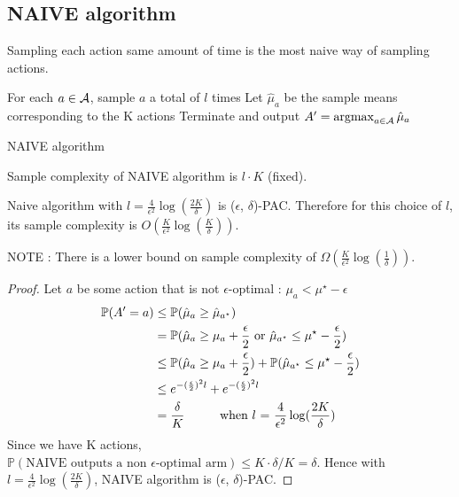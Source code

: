 \documentclass[11pt]{article}
\begin{document}
\subsection{NAIVE algorithm}
Sampling each action same amount of time is the most naive way of sampling actions. 
\begin{algorithm}
	\begin{algorithmic}[1]
		\STATE For each $a \in \mathcal{A}$, sample $a$ a total of $l$ times
		\STATE Let $\hat \mu_a$ be the sample means corresponding to the K actions
		\STATE Terminate and output $A' = \operatorname*{argmax}_{a\in\mathcal{A}}\hat\mu_a$
		\end{algorithmic}
		\caption{NAIVE algorithm}
\end{algorithm}

\noindent Sample complexity of NAIVE algorithm is $l \cdot K$ (fixed).


\begin{theorem}
	Naive algorithm with $l = \frac{4}{\epsilon^2}\log(\frac{2K}{\delta})$ is ($\epsilon$, $\delta$)-PAC. Therefore for this choice of $l$, its sample complexity is $O(\frac{K}{\epsilon^2}\log(\frac{K}{\delta}))$.
\end{theorem}		
\noindent NOTE : There is a lower bound on sample complexity of $\Omega(\frac{K}{\epsilon^2}\log(\frac{1}{\delta}))$.


\begin{proof}
Let $a$ be some action that is not $\epsilon$-optimal : $\mu_a < \mu^\star - \epsilon$
	\begin{align*}
    		\mathbb{P}(A' = a) & \leq \mathbb{P}(\hat\mu_a \geq \hat\mu_{a^\star}) \\
		& = \mathbb{P}(\hat\mu_a \geq \mu_a + \frac{\epsilon}{2} \text{ or } \hat\mu_{a^\star} \leq \mu^\star - \frac{\epsilon}{2}) \\
		& \leq \mathbb{P}(\hat\mu_a \geq \mu_a + \frac{\epsilon}{2}) + \mathbb{P}(\hat\mu_{a^\star} \leq \mu^\star - \frac{\epsilon}{2})\\
		& \leq e^{-(\frac{\epsilon}{2})^2 l} + e^{-(\frac{\epsilon}{2})^2 l} \\
		& = \frac{\delta}{K} \text{\hspace{1cm}when $l$ = } \frac{4}{\epsilon^2}\log(\frac{2K}{\delta})\\
	\end{align*}
	Since we have K actions, $\mathbb{P}(\text{NAIVE outputs a non $\epsilon$-optimal arm}) \leq K \cdot \delta/K = \delta$. Hence with $l = \frac{4}{\epsilon^2}\log(\frac{2K}{\delta})$, NAIVE algorithm is ($\epsilon$, $\delta$)-PAC.
\end{proof}
\end{document}
